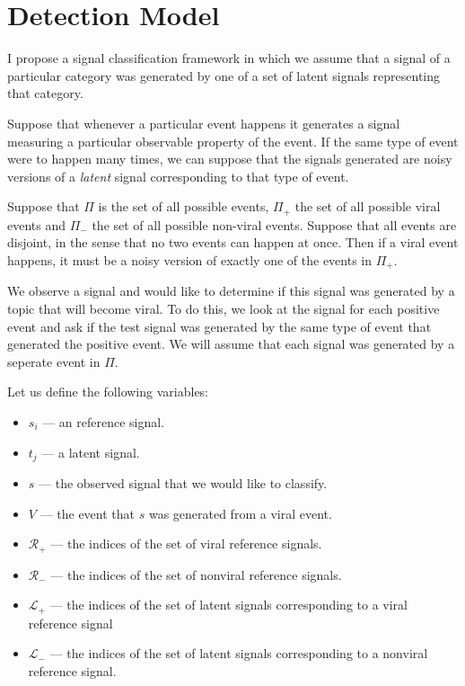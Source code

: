 \chapter{Detection Model}

I propose a signal classification framework in which we assume that a signal of a particular category was generated by one of a set of latent signals representing that category.

Suppose that whenever a particular event happens it generates a signal measuring a particular observable property of the event. If the same type of event were to happen many times, we can suppose that the signals generated are noisy versions of a {\em latent} signal corresponding to that type of event.

Suppose that $\Pi$ is the set of all possible events, $\Pi_+$ the set of all possible viral events and $\Pi_-$ the set of all possible non-viral events. Suppose that all events are disjoint, in the sense that no two events can happen at once. Then if a viral event happens, it must be a noisy version of exactly one of the events in $\Pi_+$.

We observe a signal and would like to determine if this signal was generated by a topic that will become viral. To do this, we look at the signal for each positive event and ask if the test signal was generated by the same type of event that generated the positive event. We will assume that each signal was generated by a seperate event in $\Pi$. 

Let us define the following variables:

\begin{itemize}
\item $s_i$ --- an reference signal.
\item $t_j$ --- a latent signal.
\item $s$ --- the observed signal that we would like to classify.
\item $V$ --- the event that $s$ was generated from a viral event. 
\item $\mathcal{R}_+$ --- the indices of the set of viral reference signals.
\item $\mathcal{R}_-$ --- the indices of the set of nonviral reference signals.
\item $\mathcal{L}_+$ --- the indices of the set of latent signals corresponding to a viral reference signal
\item $\mathcal{L}_-$ --- the indices of the set of latent signals corresponding to a nonviral reference signal.
\end{itemize}

